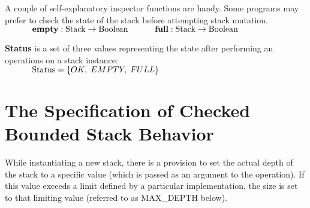 \documentclass[10pt]{article}
\begin{document}
  A couple of self-explanatory inspector functions are handy. Some programs may prefer to check the state of the stack before attempting stack mutation.
  \vspace*{6pt}\\\(
  \hspace*{32pt}\textbf{empty}: \mathrm{Stack} \rightarrow \mathrm{Boolean}\vspace*{4pt}\\
  \hspace*{32pt}\textbf{full}: \mathrm{Stack} \rightarrow \mathrm{Boolean}
  \)\vspace*{6pt}

  
  \textbf{Status} is a set of three values representing the state after performing an operations on a stack instance: 
   \vspace*{6pt}\\\(\hspace*{32pt}\mathrm{Status} = \{OK, \; EMPTY, \; FULL\} \)

  \section{The Specification of Checked Bounded Stack Behavior}
    While instantiating a new stack, there is a provision to set the actual depth of the stack to a specific value (which is passed as an argument to the operation). If this value exceeds a limit defined by a particular implementation, the size is set to that limiting value (referred to as MAX\_DEPTH below).
\end{document}
